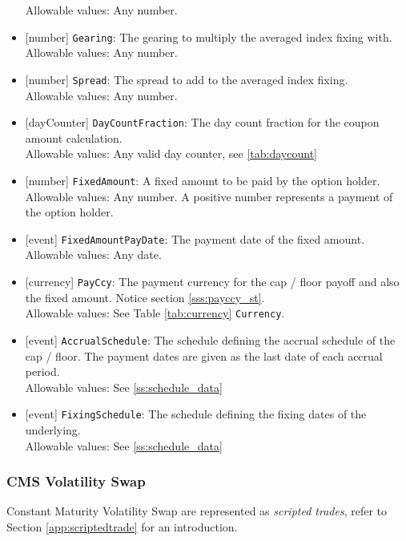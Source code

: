 \begin{itemize}
    Allowable values: Any number.
  \item{}[number] \lstinline!Gearing!: The gearing to multiply the averaged index fixing with.\\
    Allowable values: Any number.
  \item{}[number] \lstinline!Spread!: The spread to add to the averaged index fixing.\\
    Allowable values: Any number.
  \item{}[dayCounter] \lstinline!DayCountFraction!: The day count fraction for the coupon amount calculation.\\
    Allowable values: Any valid day counter, see \ref{tab:daycount}
  \item{}[number] \lstinline!FixedAmount!: A fixed amount to be paid by the option holder.\\
    Allowable values: Any number. A positive number represents a payment of the option holder.
  \item{}[event] \lstinline!FixedAmountPayDate!: The payment date of the fixed amount.\\
    Allowable values: Any date.
  \item{}[currency] \lstinline!PayCcy!: The payment currency for the cap / floor payoff and also the fixed amount. Notice section \ref{sss:payccy_st}.\\
    Allowable values: See Table \ref{tab:currency} \lstinline!Currency!.
  \item{}[event] \lstinline!AccrualSchedule!: The schedule defining the accrual schedule of the cap / floor. The payment dates are
    given as the last date of each accrual period.\\
    Allowable values: See \ref{ss:schedule_data}
  \item{}[event] \lstinline!FixingSchedule!: The schedule defining the fixing dates of the underlying.\\
    Allowable values: See \ref{ss:schedule_data}
\end{itemize}

\subsubsection{CMS Volatility Swap}

Constant Maturity Volatility Swap are represented as {\em scripted trades}, refer to Section
\ref{app:scriptedtrade} for an introduction.


